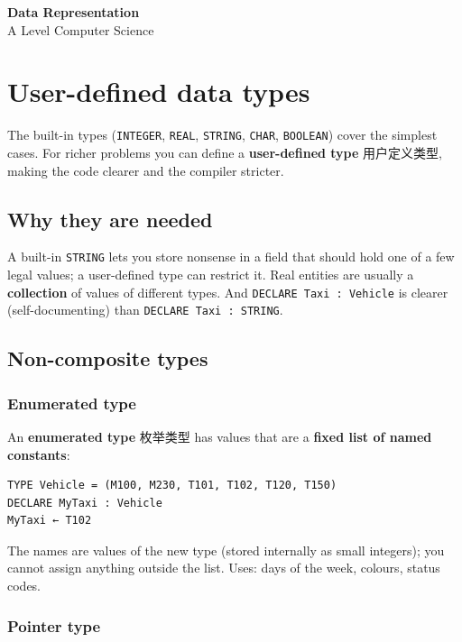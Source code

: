 \documentclass[11pt]{article}
\begin{document}
\begin{center}
  {\LARGE\bfseries Data Representation}\\[0.35em]
  {\large A Level Computer Science}
\end{center}
\vspace{0.6em}

\section*{User-defined data types}

The built-in types (\texttt{INTEGER}, \texttt{REAL}, \texttt{STRING}, \texttt{CHAR}, \texttt{BOOLEAN}) cover the simplest cases. For richer problems you can define a \textbf{user-defined type} 用户定义类型, making the code clearer and the compiler stricter.

\subsection*{Why they are needed}

A built-in \texttt{STRING} lets you store nonsense in a field that should hold one of a few legal values; a user-defined type can restrict it. Real entities are usually a \textbf{collection} of values of different types. And \texttt{DECLARE Taxi : Vehicle} is clearer (self-documenting) than \texttt{DECLARE Taxi : STRING}.

\subsection*{Non-composite types}

\subsubsection*{Enumerated type}

An \textbf{enumerated type} 枚举类型 has values that are a \textbf{fixed list of named constants}:

\begin{Verbatim}
TYPE Vehicle = (M100, M230, T101, T102, T120, T150)
DECLARE MyTaxi : Vehicle
MyTaxi ← T102
\end{Verbatim}

The names are values of the new type (stored internally as small integers); you cannot assign anything outside the list. Uses: days of the week, colours, status codes.

\subsubsection*{Pointer type}
\end{document}
